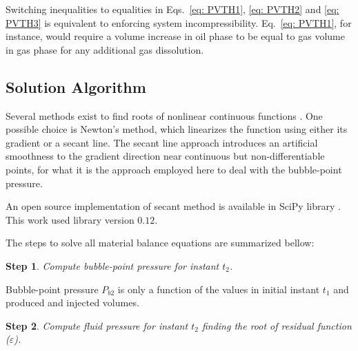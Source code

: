 \documentclass[authoryear,preprint,review,12pt]{elsarticle}
\newtheorem{step}{Step}
\begin{document}
Switching inequalities to equalities in Eqs.~\eqref{eq: PVTH1}, \eqref{eq: PVTH2} and \eqref{eq: PVTH3} is equivalent to enforcing system incompressibility. Eq.~\eqref{eq: PVTH1}, for instance, would require a volume increase in oil phase to be equal to gas volume in gas phase for any additional gas dissolution.

\subsection{Solution Algorithm}
Several methods exist to find roots of nonlinear continuous functions \citep{hamming1987numerical}. One possible choice is Newton's method, which linearizes the function using either its gradient or a secant line. The secant line approach introduces an artificial smoothness to the gradient direction near continuous but non-differentiable points, for what it is the approach employed here to deal with the bubble-point pressure.

An open source implementation of secant method is available in SciPy library \citep{scipy}. This work used library version $0.12$.




The steps to solve all material balance equations are summarized bellow:
\begin{step}
Compute bubble-point pressure for instant $t_2$.
\end{step}

Bubble-point pressure $P_{b2}$ is only a function of the values in initial instant $t_1$ and produced and injected volumes.

\begin{step}
Compute fluid pressure for instant $t_2$ finding the root of residual function ($\varepsilon$).
\end{step}
\end{document}
